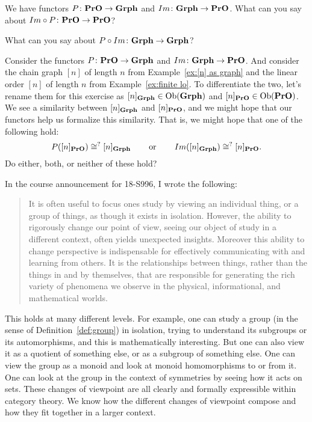 \documentclass[CT4S-EN-RU]{subfiles}
\begin{document}
\begin{exerciseRUS}
\end{exerciseRUS}

\begin{exerciseENG}
We have functors $P\colon{\mathbf{PrO}}\rightarrow{\mathbf{Grph}}$ and $Im\colon{\mathbf{Grph}}\rightarrow{\mathbf{PrO}}$.
\sexc What can you say about $Im\circ P\colon{\mathbf{PrO}}\rightarrow{\mathbf{PrO}}$?
\item What can you say about $P\circ Im\colon{\mathbf{Grph}}\rightarrow{\mathbf{Grph}}$?
\endsexc
\end{exerciseENG}

\begin{exerciseRUS}
\end{exerciseRUS}

\begin{exerciseENG}
Consider the functors $P\colon{\mathbf{PrO}}\rightarrow{\mathbf{Grph}}$ and $Im\colon{\mathbf{Grph}}\rightarrow{\mathbf{PrO}}$. And consider the chain graph $[n]$ of length $n$ from Example~\ref{ex:[n] as graph} and the linear order $[n]$ of length $n$ from Example~\ref{ex:finite lo}. To differentiate the two, let's rename them for this exercise as $[n]_{{\mathbf{Grph}}}\in\textnormal{Ob}({\mathbf{Grph}})$ and $[n]_{{\mathbf{PrO}}}\in\textnormal{Ob}({\mathbf{PrO}})$. We see a similarity between $[n]_{{\mathbf{Grph}}}$ and $[n]_{{\mathbf{PrO}}}$, and we might hope that our functors help us formalize this similarity. That is, we might hope that one of the following hold: 
$$P([n]_{{\mathbf{PrO}}})\cong^? [n]_{{\mathbf{Grph}}}\hspace{.3in}\textnormal{or}\hspace{.3in} Im([n]_{{\mathbf{Grph}}})\cong^? [n]_{{\mathbf{PrO}}}.$$ 
Do either, both, or neither of these hold?
\end{exerciseENG}

\begin{exerciseRUS}
\end{exerciseRUS}

\begin{remarkENG}
In the course announcement for 18-S996, I wrote the following:
\begin{quote}
It is often useful to focus ones study by viewing an individual thing, or a group of things, as though it exists in isolation. However, the ability to rigorously change our point of view, seeing our object of study in a different context, often yields unexpected insights. Moreover this ability to change perspective is indispensable for effectively communicating with and learning from others. It is the relationships between things, rather than the things in and by themselves, that are responsible for generating the rich variety of phenomena we observe in the physical, informational, and mathematical worlds.
\end{quote}
This holds at many different levels. For example, one can study a group (in the sense of Definition~\ref{def:group}) in isolation, trying to understand its subgroups or its automorphisms, and this is mathematically interesting. But one can also view it as a quotient of something else, or as a subgroup of something else. One can view the group as a monoid and look at monoid homomorphisms to or from it. One can look at the group in the context of symmetries by seeing how it acts on sets. These changes of viewpoint are all clearly and formally expressible within category theory. We know how the different changes of viewpoint compose and how they fit together in a larger context. 
\end{remarkENG}
\end{document}
